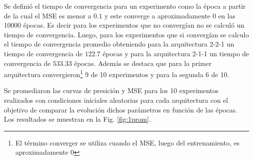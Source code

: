 \documentclass[11pt,twocolumn,twoside]{opticajnl}
\begin{document}
Se definió el tiempo de convergencia para un experimento como la época a partir de la cual el MSE es menor a $0.1$ y este converge a aproximadamente 0 en las 10000 épocas. Es decir para los experimentos que no convergían no se calculó un tiempo de convergencia. Luego, para los experimentos que si convergían se calculo el tiempo de convergencia promedio obteniendo para la arquitectura 2-2-1 un tiempo de convergencia de $122.7$ épocas y para la arquitectura 2-1-1 un tiempo de convergencia de $533.33$ épocas. Además se destaca que para la primer arquitectura convergieron\footnote{El término converger se utiliza cuando el MSE, luego del entrenamiento, es aproximadamente 0} 9 de 10 experimentos y para la segunda 6 de 10.

Se promediaron las curvas de presición y MSE para los 10 experimentos realizados con condiciones iniciales aleatorias para cada arquitectura con el objetivo de comparar la evolución dichos parámetros en función de las épocas. Los resultados se muestran en la Fig. \ref{fig:1prom}. 
\end{document}
